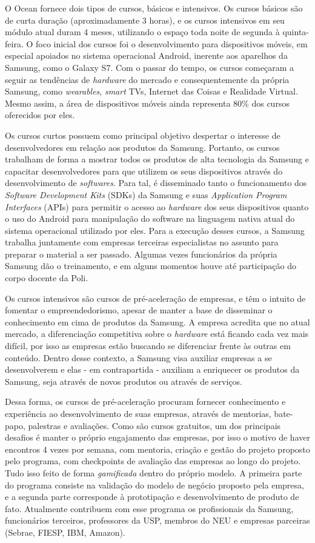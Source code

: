 O Ocean fornece dois tipos de cursos, básicos e intensivos. Os cursos básicos são de curta duração (aproximadamente 3 horas), e os cursos intensivos em seu módulo atual duram 4 meses, utilizando o espaço toda noite de segunda à quinta-feira. O foco inicial dos cursos foi o desenvolvimento para dispositivos móveis, em especial apoiados no sistema operacional Android, inerente aos aparelhos da Samsung, como o Galaxy S7. Com o passar do tempo, os cursos começaram a seguir as tendências de \textit{hardware} do mercado e consequentemente da própria Samsung, como \textit{wearables}, \textit{smart} TVs, Internet das Coisas e Realidade Virtual. Mesmo assim, a área de dispositivos móveis ainda representa 80\% dos cursos oferecidos por eles.

Os cursos curtos possuem como principal objetivo despertar o interesse de desenvolvedores em relação aos produtos da Samsung. Portanto, os cursos trabalham de forma a mostrar todos os produtos de alta tecnologia da Samsung e capacitar desenvolvedores para que utilizem os seus dispositivos através do desenvolvimento de \textit{softwares}. Para tal, é disseminado tanto o funcionamento dos \textit{Software Development Kits} (SDKs) da Samsung e suas \textit{Application Program Interfaces} (APIs) para permitir o acesso ao \textit{hardware} dos seus dispositivos quanto o uso do Android para manipulação do software na linguagem nativa atual do sistema operacional utilizado por eles. Para a execução desses cursos, a Samsung trabalha juntamente com empresas terceiras especialistas no assunto para preparar o material a ser passado. Algumas vezes funcionários da própria Samsung dão o treinamento, e em alguns momentos houve até participação do corpo docente da Poli.

Os cursos intensivos são cursos de pré-aceleração de empresas, e têm o intuito de fomentar o empreendedorismo, apesar de manter a base de disseminar o conhecimento em cima de produtos da Samsung. A empresa acredita que no atual mercado, a diferenciação competitiva sobre o \textit{hardware} está ficando cada vez mais difícil, por isso as empresas estão buscando se diferenciar frente às outras em conteúdo. Dentro desse contexto, a Samsung visa auxiliar empresas a se desenvolverem e elas - em contrapartida - auxiliam a enriquecer os produtos da Samsung, seja através de novos produtos ou através de serviços.

Dessa forma, os cursos de pré-aceleração procuram fornecer conhecimento e experiência ao desenvolvimento de suas empresas, através de mentorias, bate-papo, palestras e avaliações. Como são cursos gratuitos, um dos principais desafios é manter o próprio engajamento das empresas, por isso o motivo de haver encontros 4 vezes por semana, com mentoria, criação e gestão do projeto proposto pelo programa, com checkpoints de avaliação das empresas ao longo do projeto. Tudo isso feito de forma \textit{gamificada} dentro do próprio modelo. A primeira parte do programa consiste na validação do modelo de negócio proposto pela empresa, e a segunda parte corresponde à prototipação e desenvolvimento de produto de fato. Atualmente contribuem com esse programa os profissionais da Samsung, funcionários terceiros, professores da USP, membros do NEU e empresas parceiras (Sebrae, FIESP, IBM, Amazon).

